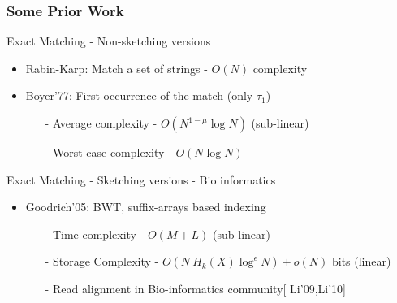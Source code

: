 \documentclass[10pt,xcolor=table]{beamer}
\begin{document}
\begin{frame} \frametitle{Some Prior Work}
	\vspace{-0.2cm}
	 \begin{block}{Exact Matching - Non-sketching versions}	 	
	 	\begin{itemize}
            \item  {Rabin-Karp}: Match a set of strings - $O(N)$ complexity
	 		\item  {Boyer'77}: First occurrence of the match (\alert{only $\tau_1$})	 		
	 		\begin{itemize}
	 			\item[-] Average complexity - $O(N^{1-\mu} \log N)$ (sub-linear)
	 			\item[-] Worst case complexity - $O(N \log N)$
	 		\end{itemize}	
	 	\end{itemize}
	 \end{block}
	
	 \begin{block}{Exact Matching - Sketching versions - Bio informatics} 	
	 	\begin{itemize}
	 		\item  {Goodrich'05}: BWT, suffix-arrays based indexing
	 		\begin{itemize}
	 			\item[-] Time complexity - $O(M + L)$ (sub-linear)
	 			\item[-] Storage Complexity - $O(N~H_k(X) \log^\epsilon N) + o(N)$ bits  (linear)
	 			\item[-] Read alignment in Bio-informatics community[ {\color{blue}Li'09,Li'10}]
	 		\end{itemize}	 		
	 	\end{itemize}
	 \end{block}
\end{frame}
\end{document}
